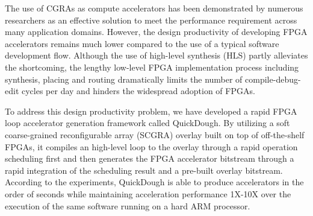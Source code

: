 The use of CGRAs as compute accelerators has been 
demonstrated by numerous researchers as an effective solution 
to meet the performance requirement across many application domains. 
However, the design productivity of developing FPGA accelerators 
remains much lower compared to the use of a typical software 
development flow. Although the use of high-level synthesis (HLS) partly 
alleviates the shortcoming, the lengthy low-level FPGA implementation 
process including synthesis, placing and routing dramatically 
limits the number of compile-debug-edit cycles per day and 
hinders the widespread adoption of FPGAs. 

To address this design productivity problem, we have developed 
a rapid FPGA loop accelerator generation framework called 
QuickDough. By utilizing a soft coarse-grained reconfigurable 
array (SCGRA) overlay built on top of off-the-shelf FPGAs, it compiles 
an high-level loop to the overlay through a rapid operation 
scheduling first and then generates the FPGA accelerator bitstream through 
a rapid integration of the scheduling result and a pre-built 
overlay bitstream. According to the experiments, QuickDough is able to 
produce accelerators in the order of seconds while maintaining acceleration 
performance 1X-10X over the execution of the same software running 
on a hard ARM processor.  


